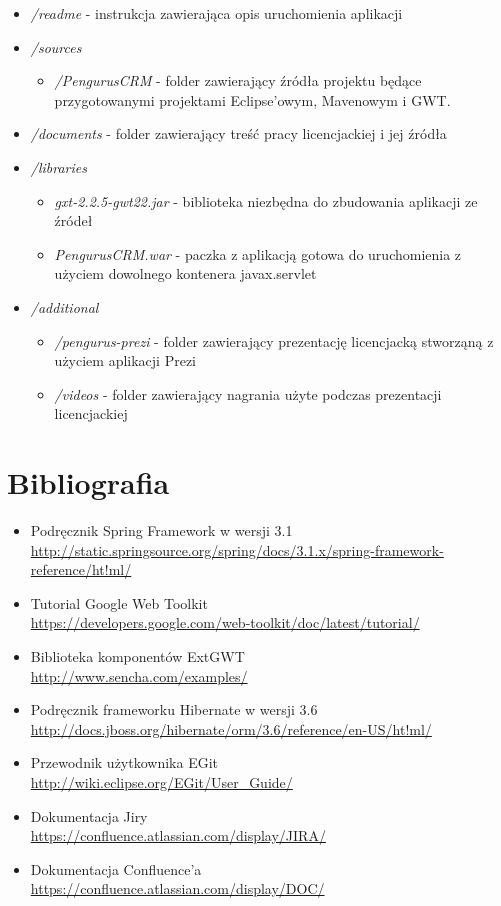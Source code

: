 \documentclass[licencjacka]{pracamgr}
\begin{document}
\begin{itemize}

\item \textit{/readme} - instrukcja zawierająca opis uruchomienia aplikacji
\item \textit{/sources}
\begin{itemize}
	\item \textit{/PengurusCRM} - folder zawierający źródła projektu będące przygotowanymi projektami Eclipse'owym, Mavenowym i GWT.
\end{itemize}
\item \textit{/documents} - folder zawierający treść pracy licencjackiej i jej źródła
\item \textit{/libraries}
\begin{itemize}
	\item \textit{gxt-2.2.5-gwt22.jar} - biblioteka niezbędna do zbudowania aplikacji ze źródeł
	\item \textit{PengurusCRM.war} - paczka z aplikacją gotowa do uruchomienia z użyciem dowolnego kontenera javax.servlet
\end{itemize}
\item \textit{/additional}
\begin{itemize}
	\item \textit{/pengurus-prezi} - folder zawierający prezentację licencjacką stworząną z użyciem aplikacji Prezi
	\item \textit{/videos} - folder zawierający nagrania użyte podczas prezentacji licencjackiej
\end{itemize}
\end{itemize}

\chapter{Bibliografia}

\begin{itemize}
\item Podręcznik Spring Framework w wersji 3.1 \\
\url{http://static.springsource.org/spring/docs/3.1.x/spring-framework-reference/ht!ml/}
\item Tutorial Google Web Toolkit \\
\url{https://developers.google.com/web-toolkit/doc/latest/tutorial/}
\item Biblioteka komponentów ExtGWT \\
\url{http://www.sencha.com/examples/}
\item Podręcznik frameworku Hibernate w wersji 3.6 \\
\url{http://docs.jboss.org/hibernate/orm/3.6/reference/en-US/ht!ml/}
\item Przewodnik użytkownika EGit \\
\url{http://wiki.eclipse.org/EGit/User_Guide/}
\item Dokumentacja Jiry \\
\url{https://confluence.atlassian.com/display/JIRA/}
\item Dokumentacja Confluence'a \\
\url{https://confluence.atlassian.com/display/DOC/}

\end{itemize}
\end{document}
